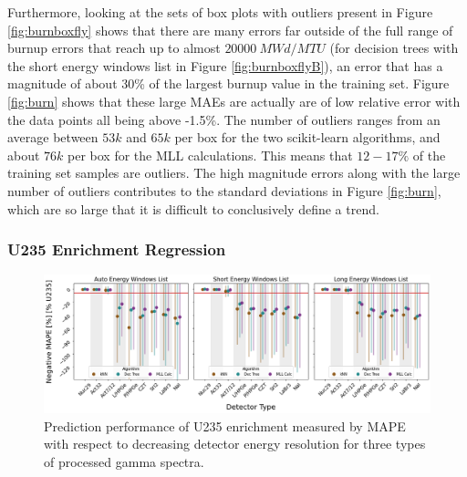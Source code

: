 Furthermore, looking at the sets of box plots with outliers present in Figure
\ref{fig:burnboxfly} shows that there are many errors far outside of the full
range of burnup errors that reach up to almost $20000\:MWd/MTU$ (for decision
trees with the short energy windows list in Figure \ref{fig:burnboxflyB}), an
error that has a magnitude of about 30\% of the largest burnup value in the
training set.  Figure \ref{fig:burn} shows that these large \gls{MAE}s are
actually are of low relative error with the data points all being above -1.5\%.
The number of outliers ranges from an average between $53k$ and $65k$ per box
for the two scikit-learn algorithms, and about $76k$ per box for the \gls{MLL}
calculations.  This means that $12-17\%$ of the training set samples are
outliers.  The high magnitude errors along with the large number of outliers
contributes to the standard deviations in Figure \ref{fig:burn}, which are so
large that it is difficult to conclusively define a trend.

\subsubsection{U235 Enrichment Regression}

\begin{figure}[!htb]
  \centering
  \includegraphics[width=\textwidth]{./chapters/exp2/detector_preds_wrt_enlist_MAPE_enri.png}
  \caption{Prediction performance of \gls{U235} enrichment measured by 
           \gls{MAPE} with respect to decreasing detector energy resolution 
           for three types of processed gamma spectra.}
  \label{fig:enri}
\end{figure}

